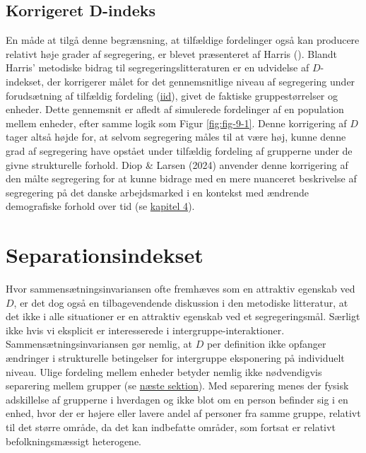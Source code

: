 \documentclass[
]{book}
\begin{document}
\subsection{Korrigeret D-indeks}\label{korrigeret-d-indeks}

En måde at tilgå denne begrænsning, at tilfældige fordelinger også kan producere relativt høje grader af segregering, er blevet præsenteret af Harris (). Blandt Harris' metodiske bidrag til segregeringslitteraturen er en udvidelse af \(D\)-indekset, der korrigerer målet for det gennemsnitlige niveau af segregering under forudsætning af tilfældig fordeling (\href{https://en.wikipedia.org/wiki/Independent_and_identically_distributed_random_variables}{iid}), givet de faktiske gruppestørrelser og enheder. Dette gennemsnit er afledt af simulerede fordelinger af en population mellem enheder, efter samme logik som Figur \ref{fig:fig-9-1}. Denne korrigering af \(D\) tager altså højde for, at selvom segregering måles til at være høj, kunne denne grad af segregering have opstået under tilfældig fordeling af grupperne under de givne strukturelle forhold. Diop \& Larsen (2024) anvender denne korrigering af den målte segregering for at kunne bidrage med en mere nuanceret beskrivelse af segregering på det danske arbejdsmarked i en kontekst med ændrende demografiske forhold over tid (se \hyperref[kap4]{kapitel 4}).

\section{Separationsindekset}\label{separationsindekset}

Hvor sammensætningsinvariansen ofte fremhæves som en attraktiv egenskab ved \(D\), er det dog også en tilbagevendende diskussion i den metodiske litteratur, at det ikke i alle situationer er en attraktiv egenskab ved et segregeringsmål. Særligt ikke hvis vi eksplicit er interesserede i intergruppe-interaktioner. Sammensætningsinvariansen gør nemlig, at \(D\) per definition ikke opfanger ændringer i strukturelle betingelser for intergruppe eksponering på individuelt niveau. Ulige fordeling mellem enheder betyder nemlig ikke nødvendigvis separering mellem grupper (se \hyperref[forskel]{næste sektion}). Med separering menes der fysisk adskillelse af grupperne i hverdagen og ikke blot om en person befinder sig i en enhed, hvor der er højere eller lavere andel af personer fra samme gruppe, relativt til det større område, da det kan indbefatte områder, som fortsat er relativt befolkningsmæssigt heterogene.
\end{document}
